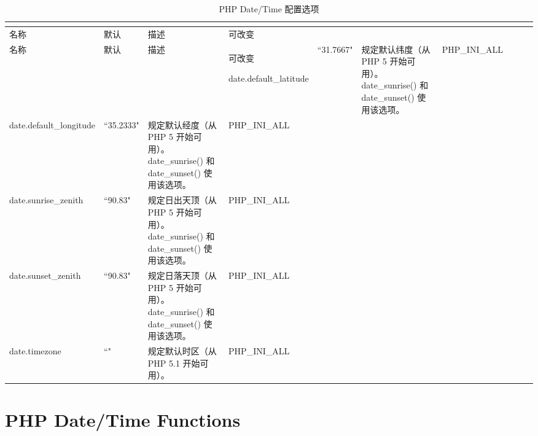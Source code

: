 \begin{longtable}{|m{90pt}|m{40pt}|m{180pt}|m{60pt}|}
\tabularnewline\hline
名称	&默认	&描述	&可改变
\endhead

\caption{PHP Date/Time 配置选项}\\
\hline
名称	&默认	&描述	&可改变
\endfirsthead

\endfoot

\endlastfoot

\hline
date.default\_latitude	 &``31.7667"	&规定默认纬度（从 PHP 5 开始可用）。date\_sunrise() 和 date\_sunset() 使用该选项。	&PHP\_INI\_ALL\\
\hline
date.default\_longitude	&``35.2333"	&规定默认经度（从 PHP 5 开始可用）。date\_sunrise() 和 date\_sunset() 使用该选项。	&PHP\_INI\_ALL\\
\hline
date.sunrise\_zenith		&``90.83"	&规定日出天顶（从 PHP 5 开始可用）。date\_sunrise() 和 date\_sunset() 使用该选项。	&PHP\_INI\_ALL\\
\hline
date.sunset\_zenith		&``90.83"	&规定日落天顶（从 PHP 5 开始可用）。date\_sunrise() 和 date\_sunset() 使用该选项。	&PHP\_INI\_ALL\\
\hline
date.timezone			&``"	&规定默认时区（从 PHP 5.1 开始可用）。	&PHP\_INI\_ALL\\
\hline
\end{longtable}






\section{PHP Date/Time Functions}








